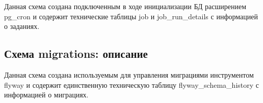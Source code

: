 Данная схема создана подключенным в ходе инициализации БД расширением pg\_cron и содержит технические таблицы
job и job\_run\_details с информацией о заданиях.

\subsection{Схема migrations: описание}\label{subsec:-migrationsdesc:-}

Данная схема создана используемым для управления миграциями инструментом flyway и содержит
единственную техническую таблицу flyway\_schema\_history с информацией о миграциях.